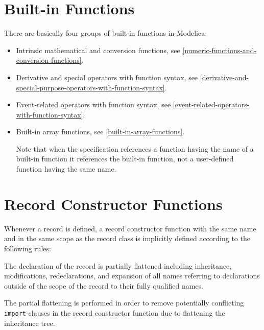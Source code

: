 \section{Built-in Functions}\label{built-in-functions}

There are basically four groups of built-in functions in Modelica:
\begin{itemize}
\item
  Intrinsic mathematical and conversion functions, see \cref{numeric-functions-and-conversion-functions}.
\item
  Derivative and special operators with function syntax,
  see \cref{derivative-and-special-purpose-operators-with-function-syntax}.
\item
  Event-related operators with function syntax, see \cref{event-related-operators-with-function-syntax}.
\item
  Built-in array functions, see \cref{built-in-array-functions}.

  Note that when the specification references a function having the name
  of a built-in function it references the built-in function, not a
  user-defined function having the same name.
\end{itemize}

\section{Record Constructor Functions}\label{record-constructor-functions}

Whenever a record is defined, a record constructor function with the
same name and in the same scope as the record class is implicitly
defined according to the following rules:

The declaration of the record is partially flattened including inheritance, modifications, redeclarations, and expansion of all names referring to declarations outside of the scope of the record to their fully qualified names.

\begin{nonnormative}
The partial flattening is performed in order to remove potentially conflicting \lstinline!import!-clauses in the record constructor function due to flattening the inheritance tree.
\end{nonnormative}


